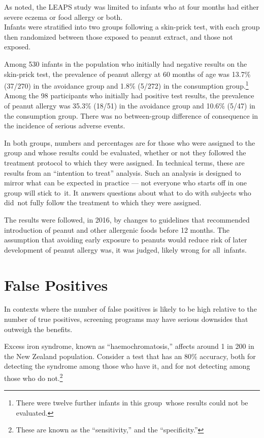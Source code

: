 \documentclass[
  10pt,
  b5paper]{book}
\begin{document}
As noted, the LEAPS study was limited to infants who at four
months had either severe eczema or food allergy or both.\\
Infants were stratified into two groups following a skin-prick
test, with each group then randomized between those exposed
to peanut extract, and those not exposed.

Among 530 infants in the population who initially had negative results on the skin-prick test, the prevalence of peanut allergy at 60 months of age was 13.7\% (37/270) in the avoidance group and 1.8\% (5/272) in the consumption group.\footnote{There were twelve further infants in this group~whose results
  could not be evaluated.}
Among the 98 participants who initially had positive test results, the prevalence of peanut allergy was 35.3\% (18/51) in the avoidance group
and 10.6\% (5/47) in the consumption group. There was no
between-group difference of consequence in the incidence of
serious adverse events.

In both groups, numbers and percentages are for those who were assigned
to the group and whose results could be evaluated, whether or not they
followed the treatment protocol to which they were assigned. In technical
terms, these are results from an ``intention to treat'' analysis. Such an
analysis is designed to mirror what can be expected in practice --- not
everyone who starts off in one group will stick to~it. It answers
questions about what to do with subjects who did~not fully follow
the treatment to which they were assigned.

The results were followed, in 2016, by changes to guidelines that
recommended introduction of peanut and other allergenic foods
before 12 months. The assumption that avoiding early exposure to
peanuts would reduce risk of later development of peanut allergy
was, it was judged, likely wrong for all~infants.

\hypertarget{false-positives}{%
\section{False Positives}\label{false-positives}}

In contexts where the number of false positives is likely to be
high relative to the number of true positives, screening
programs may have serious downsides that outweigh the benefits.

Excess iron syndrome, known as ``haemochromatosis,'' affects
around 1 in 200 in the New Zealand population. Consider a
test that has an 80\% accuracy, both for detecting the syndrome
among those who have it, and for not detecting among those
who do not.\footnote{These are known as the ``sensitivity,'' and the
  ``specificity.''}
\end{document}
